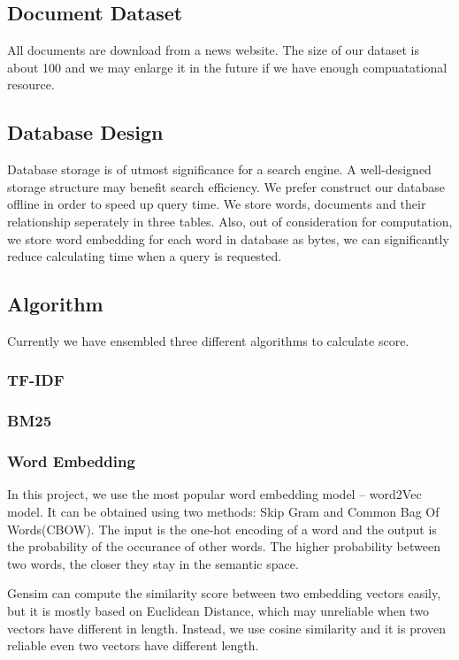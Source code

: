 \documentclass{article}
\begin{document}
\subsection{Document Dataset}
All documents are download from a news website. The size of our dataset is about 100 and we may enlarge it in the future if we have enough compuatational resource.


\subsection{Database Design}
Database storage is of utmost significance for a search engine. A well-designed storage structure may benefit search efficiency. We prefer construct our database offline in order to speed up query time. We store words, documents and their relationship seperately in three tables. Also, out of consideration for computation, we store word embedding for each word in database as bytes, we can significantly reduce calculating time when a query is requested.


\subsection{Algorithm}
Currently we have ensembled three different algorithms to calculate score.

\subsubsection{TF-IDF}

\subsubsection{BM25}

\subsubsection{Word Embedding}
In this project, we use the most popular word embedding model -- word2Vec model. It can be obtained using two methods: Skip Gram and Common Bag Of Words(CBOW). The input is the one-hot encoding of a word and the output is the probability of the occurance of other words. The higher probability between two words, the closer they stay in the semantic space.

Gensim can compute the similarity score between two embedding vectors easily, but it is mostly based on Euclidean Distance, which may unreliable when two vectors have different in length. Instead, we use cosine similarity and it is proven reliable even two vectors have different length.
\end{document}
